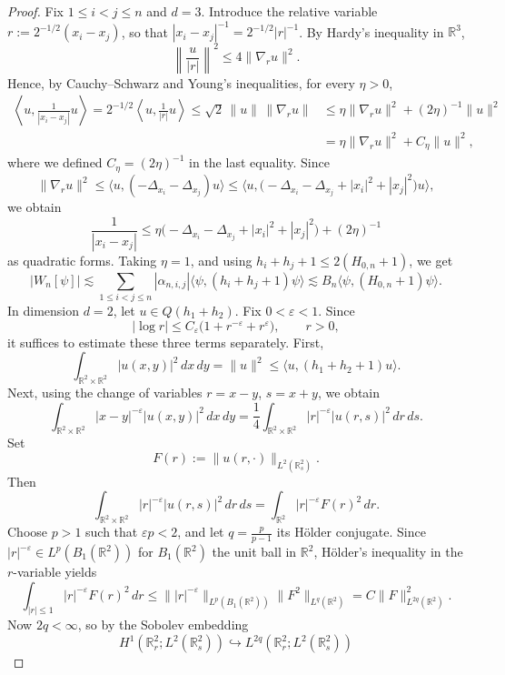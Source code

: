 \documentclass[11pt]{amsart}
\newcommand{\1}{\mathbbm{1}}
\newcommand{\R}{\mathbb{R}}
\theoremstyle{plain}
\theoremstyle{definition}
\theoremstyle{remark}
\numberwithin{equation}{section}
\begin{document}
\begin{proof}
 Fix $1\le i<j\le n$ and $d=3$. Introduce the relative variable $r:=2^{-1/2}{(x_i-x_j)}$, so that ${|x_i-x_j|^{-1}}=2^{-1/2}{|r|^{-1}}$. By Hardy's inequality in $\mathbb R^3$,
\[
\left\|\frac{u}{|r|}\right\|^2\le 4\|\nabla_r u\|^2.
\]
Hence, by Cauchy--Schwarz and Young's inequalities, for every \(\eta>0\),
\begin{align*}
\left\langle u,\frac{1}{|x_i-x_j|}u\right\rangle
=
2^{-1/2}\left\langle u,\frac{1}{|r|}u\right\rangle
\le
\sqrt2\,\|u\|\,\|\nabla_r u\|
&\le
\eta\|\nabla_r u\|^2+ (2\eta)^{-1}\|u\|^2\\
&= \eta\|\nabla_r u\|^2+ C_\eta\|u\|^2,
\end{align*}
where we defined $C_\eta = (2\eta)^{-1}$ in the last equality.
Since
\[
\|\nabla_r u\|^2\le \langle u,(-\Delta_{x_i}-\Delta_{x_j})u\rangle
\le
\langle u,\bigl(-\Delta_{x_i}-\Delta_{x_j}+|x_i|^2+|x_j|^2\bigr)u\rangle,
\]
we obtain
\begin{equation}
\frac{1}{|x_i-x_j|}
\le
\eta\bigl(-\Delta_{x_i}-\Delta_{x_j}+|x_i|^2+|x_j|^2\bigr)+(2\eta)^{-1} \label{usefulestimate111}
\end{equation}
as quadratic forms. Taking \(\eta=1\), and using \(h_i+h_j+1\le 2(H_{0,n}+1)\), we get
\[
|W_n[\psi]|
\lesssim
\sum_{1\le i<j\le n}|\alpha_{n,i,j}|\langle\psi,(h_i+h_j+1)\psi\rangle
\lesssim
B_n\langle\psi,(H_{0,n}+1)\psi\rangle.
\]
In dimension \(d=2\), let \(u\in Q(h_1+h_2)\). Fix \(0<\varepsilon<1\). Since
\[
|\log r|\le C_\varepsilon\bigl(1+r^{-\varepsilon}+r^\varepsilon\bigr),\qquad r>0,
\]
it suffices to estimate these three terms separately. First,
\[
\int_{\R^2\times\R^2}|u(x,y)|^2\,dx\,dy=\|u\|^2
\le
\langle u,(h_1+h_2+1)u\rangle.
\]
Next, using the change of variables \(r=x-y\), \(s=x+y\), we obtain
\[
\int_{\R^2\times\R^2}|x-y|^{-\varepsilon}|u(x,y)|^2\,dx\,dy
=
\frac{1}{4}\int_{\R^2\times\R^2}|r|^{-\varepsilon}|u(r,s)|^2\,dr\,ds.
\]
Set
\[
F(r):=\|u(r,\cdot)\|_{L^2(\R^2_s)}.
\]
Then
\[
\int_{\R^2\times\R^2}|r|^{-\varepsilon}|u(r,s)|^2\,dr\,ds
=\int_{\R^2}|r|^{-\varepsilon}F(r)^2\,dr.
\]
Choose \(p>1\) such that \(\varepsilon p<2\), and let \(q=\frac p{p-1}\) its Hölder conjugate. Since
\(|r|^{-\varepsilon}\in L^p(B_1(\R^2))\) for $B_1(\mathbb{R}^2)$ the unit ball in $\mathbb{R}^2$, Hölder's inequality in the \(r\)-variable yields
\[
\int_{|r|\le1}|r|^{-\varepsilon}F(r)^2\,dr
\le
\bigl\||r|^{-\varepsilon}\bigr\|_{L^p(B_1(\mathbb{R}^2))}\|F^2\|_{L^q(\R^2)}
=
C\|F\|_{L^{2q}(\R^2)}^2.
\]
Now \(2q<\infty\), so by the Sobolev embedding
\[
H^1(\R^2_r;L^2(\R^2_s))\hookrightarrow L^{2q}(\R^2_r;L^2(\R^2_s))
\]
\end{proof}
\end{document}
